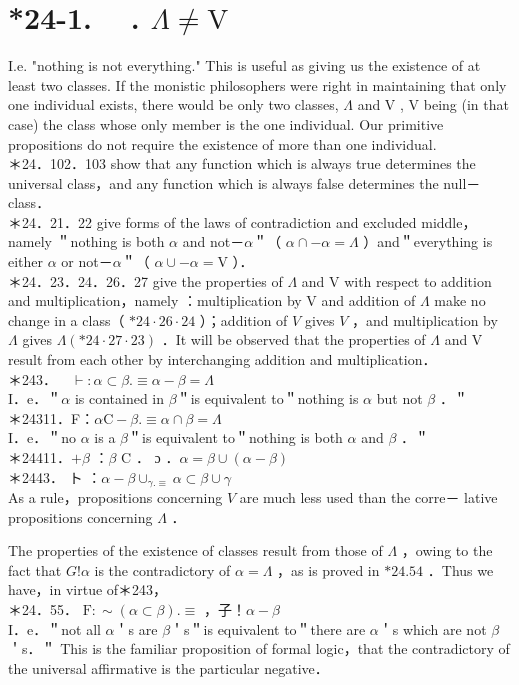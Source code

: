 \documentclass[10pt]{article}
\begin{document}
\section*{*24-1. $\quad$. $\Lambda \neq \mathrm{V}$}
I.e. "nothing is not everything." This is useful as giving us the existence of at least two classes. If the monistic philosophers were right in maintaining that only one individual exists, there would be only two classes, $\Lambda$ and V , V being (in that case) the class whose only member is the one individual. Our primitive propositions do not require the existence of more than one individual.\\
＊24．102．103 show that any function which is always true determines the universal class，and any function which is always false determines the null－ class．\\
＊24．21．22 give forms of the laws of contradiction and excluded middle，namely ＂nothing is both $\alpha$ and not－$\alpha$＂（ $\alpha \cap-\alpha=\Lambda$ ）and＂everything is either $\alpha$ or not－$\alpha$＂（ $\alpha \cup-\alpha=\mathrm{V}$ ）．\\
＊24．23．24．26．27 give the properties of $\Lambda$ and V with respect to addition and multiplication，namely ：multiplication by V and addition of $\Lambda$ make no change in a class（ $* 24 \cdot 26 \cdot 24$ ）；addition of $V$ gives $V$ ，and multiplication by $\Lambda$ gives $\Lambda (* 24 \cdot 27 \cdot 23)$ ．It will be observed that the properties of $\Lambda$ and V result from each other by interchanging addition and multiplication．\\
＊243．$\quad \vdash: \alpha \subset \beta . \equiv \alpha-\beta=\Lambda$\\
I．e．＂$\alpha$ is contained in $\beta$＂is equivalent to＂nothing is $\alpha$ but not $\beta$ ．＂\\
＊24311．F：$\alpha \mathrm{C}-\beta . \equiv \alpha \cap \beta=\Lambda$\\
I．e．＂no $\alpha$ is a $\beta$＂is equivalent to＂nothing is both $\alpha$ and $\beta$ ．＂\\
＊24411．$+\beta$ ：$\beta$ C ． ɔ ．$\alpha=\beta \cup(\alpha-\beta)$\\
＊2443． ト ：$\alpha-\beta \cup_{\gamma . \equiv} \alpha \subset \beta \cup \gamma$\\
As a rule，propositions concerning $V$ are much less used than the corre－ lative propositions concerning $\Lambda$ ．

The properties of the existence of classes result from those of $\Lambda$ ，owing to the fact that $G!\alpha$ is the contradictory of $\alpha=\Lambda$ ，as is proved in $* 24.54$ ．Thus we have，in virtue of＊243，\\
＊24．55． $\mathrm{F}: \sim(\alpha \subset \beta) . \equiv$ ，子！$\alpha-\beta$\\
I．e．＂not all $\alpha$＇s are $\beta$＇s＂is equivalent to＂there are $\alpha$＇s which are not $\beta$＇s．＂ This is the familiar proposition of formal logic，that the contradictory of the universal affirmative is the particular negative．
\end{document}
